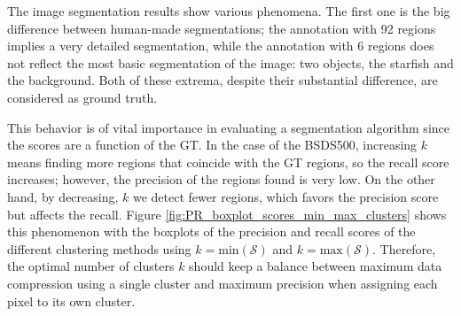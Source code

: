 \documentclass[journal]{IEEEtran}
\begin{document}
The image segmentation results show various phenomena. The first one is the big difference between human-made segmentations; the annotation with 92 regions implies a very detailed segmentation, while the annotation with 6 regions does not reflect the most basic segmentation of the image: two objects, the starfish and the background. Both of these extrema, despite their substantial difference, are considered as ground truth.

This behavior is of vital importance in evaluating a segmentation algorithm since the scores are a function of the GT. In the case of the BSDS500, increasing $k$ means finding more regions that coincide with the GT regions, so the recall score increases; however, the precision of the regions found is very low. On the other hand, by decreasing, $k$ we detect fewer regions, which favors the precision score but affects the recall. Figure \ref{fig:PR_boxplot_scores_min_max_clusters} shows this phenomenon with the boxplots of the precision and recall scores of the different clustering methods using $k = \mathrm{min}(\mathcal{S})$ and $k = \mathrm{max}(\mathcal{S})$. Therefore, the optimal number of clusters $k$ should keep a balance between maximum data compression using a single cluster and maximum precision when assigning each pixel to its own cluster.
\end{document}
